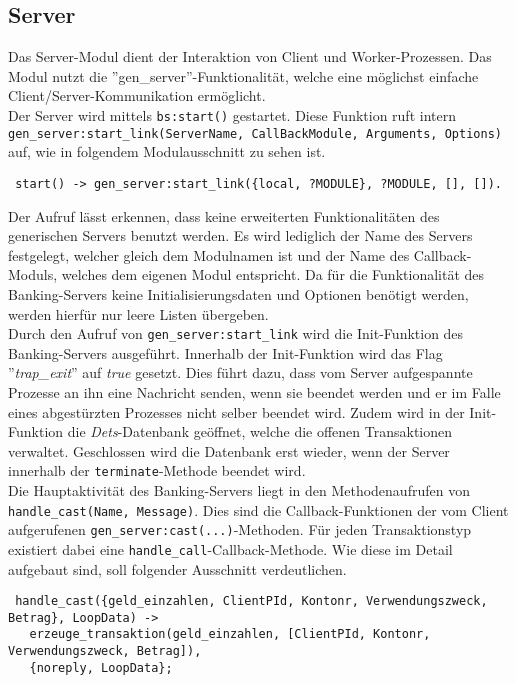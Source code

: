 \subsection{Server}
Das Server-Modul dient der Interaktion von Client und Worker-Prozessen. Das Modul nutzt die ''gen\_server''-Funktionalität, welche eine möglichst einfache Client/Server-Kommunikation ermöglicht.\\
Der Server wird mittels \texttt{bs:start()} gestartet. Diese Funktion ruft intern \texttt{gen\_server:start\_link(ServerName, CallBackModule, Arguments, Options)} auf, wie in folgendem Modulausschnitt zu sehen ist.
\begin{lstlisting}
 start() -> gen_server:start_link({local, ?MODULE}, ?MODULE, [], []).
\end{lstlisting}
Der Aufruf lässt erkennen, dass keine erweiterten Funktionalitäten des generischen Servers benutzt werden. Es wird lediglich der Name des Servers festgelegt, welcher gleich dem Modulnamen ist und der Name des Callback-Moduls, welches dem eigenen Modul entspricht. Da für die Funktionalität des Banking-Servers keine Initialisierungsdaten und Optionen benötigt werden, werden hierfür nur leere Listen übergeben.\\
Durch den Aufruf von \texttt{gen\_server:start\_link} wird die Init-Funktion des Banking-Servers ausgeführt.
Innerhalb der Init-Funktion wird das Flag ''\textit{trap\_exit}'' auf \textit{true} gesetzt. Dies führt dazu, dass vom Server aufgespannte Prozesse an ihn eine Nachricht senden, wenn sie beendet werden und er im Falle eines abgestürzten Prozesses nicht selber beendet wird. Zudem wird in der Init-Funktion die \textit{Dets}-Datenbank geöffnet, welche die offenen Transaktionen verwaltet. Geschlossen wird die Datenbank erst wieder, wenn der Server innerhalb der \texttt{terminate}-Methode beendet wird.\\
Die Hauptaktivität des Banking-Servers liegt in den Methodenaufrufen von \texttt{handle\_cast(Name, Message)}. Dies sind die Callback-Funktionen der vom Client aufgerufenen \texttt{gen\_server:cast(...)}-Methoden. Für jeden Transaktionstyp existiert dabei eine \texttt{handle\_call}-Callback-Methode. Wie diese im Detail aufgebaut sind, soll folgender Ausschnitt verdeutlichen.
\begin{lstlisting}
 handle_cast({geld_einzahlen, ClientPId, Kontonr, Verwendungszweck, Betrag}, LoopData) ->
   erzeuge_transaktion(geld_einzahlen, [ClientPId, Kontonr, Verwendungszweck, Betrag]),
   {noreply, LoopData};
\end{lstlisting}

